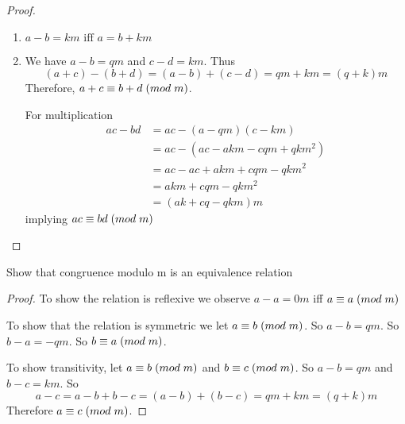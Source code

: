 \begin{exercise}
\begin{proof}
\begin{enumerate}
	            \item \( a - b = km \text{ iff } a = b + km \)
	            
	            \item We have \( a - b = qm \) and \( c - d = km \). Thus 
	            \[ (a+c) - (b+d) = (a-b) + (c-d) = qm + km = (q+k)m \]
	            Therefore, \( a+c \equiv b+d \hspace{1mm} (mod \hspace{1mm} m) \). 
	            
	            For multiplication
	            \begin{align*}
	                ac - bd &= ac - (a - qm)(c - km) \\
	                &= ac - (ac - akm - cqm + qkm^2) \\
	                &= ac - ac + akm + cqm - qkm^2 \\
	                &= akm + cqm - qkm^2 \\
	                &= (ak + cq - qkm)m
	            \end{align*}
	            implying \( ac \equiv bd \hspace{1mm} (mod \hspace{1mm} m) \)
	        \end{enumerate}
	    \end{proof}
\end{exercise}

\begin{exercise} \label{0.67}
	Show that congruence modulo m is an equivalence relation
	\begin{proof}
	    To show the relation is reflexive we observe \( a - a = 0m \) iff \( a \equiv a \hspace{1mm} (mod \hspace{1mm} m) \)
	    
	    To show that the relation is symmetric we let \( a \equiv b \hspace{1mm} (mod \hspace{1mm} m) \). So \( a - b = qm \). So \( b - a = -qm \). So \( b \equiv a \hspace{1mm} (mod \hspace{1mm} m) \).
	    
	    To show transitivity, let \( a \equiv b \hspace{1mm} (mod \hspace{1mm} m) \) and \( b \equiv c \hspace{1mm} (mod \hspace{1mm} m) \). So \( a - b = qm \) and \( b - c = km \). So
	    \[ a - c = a - b + b -c = (a - b) + (b - c) = qm + km = (q+k)m \]
	    Therefore \( a \equiv c \hspace{1mm} (mod \hspace{1mm} m) \).
	\end{proof}
\end{exercise}

